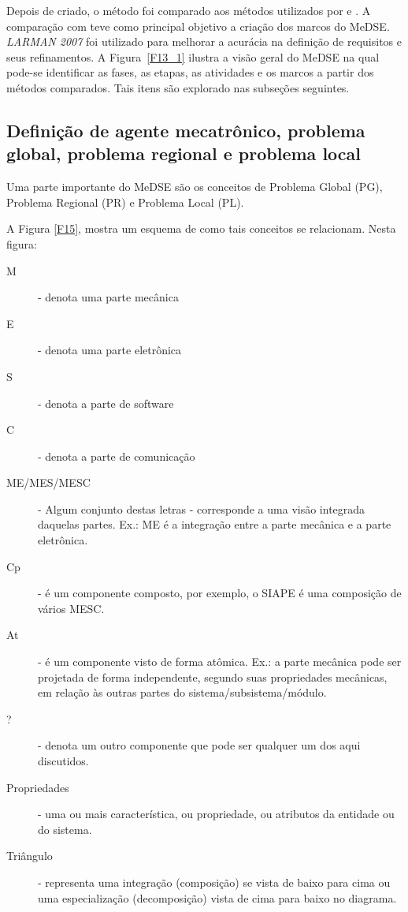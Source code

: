 Depois de criado, o método foi comparado aos métodos utilizados por  e . A comparação com \citeauthor{RUMBAUGH2006} teve como principal objetivo a criação dos marcos do MeDSE. \textit{LARMAN 2007} foi utilizado para melhorar a acurácia na definição de requisitos e seus refinamentos. 
A Figura~\ref{F13_1} ilustra a visão geral do MeDSE na qual pode-se identificar as fases, as etapas, as atividades e os marcos a partir dos métodos comparados. Tais itens são explorado nas subseções seguintes.


\subsection{Definição de agente mecatrônico, problema global, problema regional e problema local}

Uma parte importante do MeDSE são os conceitos de Problema Global (PG), Problema Regional (PR) e Problema Local (PL).


A Figura \ref{F15}, mostra um esquema de como tais conceitos se relacionam. Nesta figura:
\begin{description}
	\item[M] - denota uma parte mecânica
	\item [E] - denota uma parte eletrônica
	\item  [S] - denota a parte de software
	\item  [C] - denota a parte de comunicação
	\item  [ME/MES/MESC] - Algum conjunto destas letras - corresponde a uma visão integrada daquelas partes. Ex.: ME é a integração entre a parte mecânica e a parte eletrônica.
	\item  [Cp] - é um componente composto, por exemplo, o SIAPE é uma composição de vários MESC.
	\item  [At] - é um componente visto de forma atômica. Ex.: a parte mecânica pode ser projetada de forma independente, segundo suas propriedades mecânicas, em relação às outras partes do sistema/subsistema/módulo.
	\item  [?] - denota um outro componente que pode ser qualquer um dos aqui discutidos.
	\item  [Propriedades] - uma ou mais característica, ou propriedade, ou atributos da entidade ou do sistema.
	\item  [Triângulo] - representa uma integração (composição) se vista de baixo para cima ou uma especialização (decomposição) vista de cima para baixo no diagrama.
\end{description}


